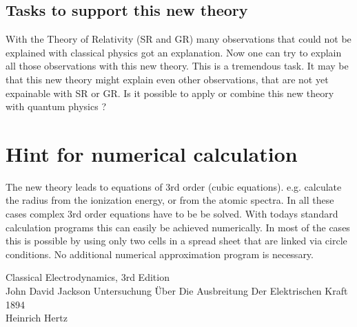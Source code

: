 \documentclass[10pt,titlepage]{article}
\begin{document}


\subsection{Tasks to support this new theory}
With the Theory of Relativity (SR and GR) many observations that could not be explained with classical physics got an explanation. 
Now one can try to explain all those observations with this new theory. This is a tremendous task. It may be that this new theory might explain even other observations, that are not yet expainable with SR or GR. 
Is it possible to apply or combine this new theory with quantum physics ? 


\section{Hint for numerical calculation}
The new theory leads to equations of 3rd order (cubic equations). e.g. calculate the radius from the ionization energy, or from the atomic spectra. In all these cases complex 3rd order equations have to be be solved.
With todays standard calculation programs this can easily be achieved numerically. In most of the cases this is possible by using only two cells in a spread sheet that are linked via circle conditions. No additional numerical approximation program is necessary.


\newpage


\begin{thebibliography}{100}
	   Classical Electrodynamics,  3rd Edition
	\\
	John David Jackson
	   Untersuchung Über Die Ausbreitung Der Elektrischen Kraft 1894
	\\
	Heinrich Hertz
\end{thebibliography}
\end{document}
